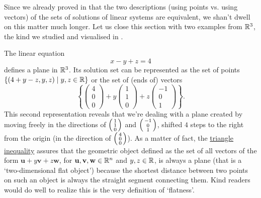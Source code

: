 Since we already proved in
 that the two
descriptions (using points vs. using vectors) of the sets of solutions of linear
systems are equivalent, we shan't dwell on this matter much longer. Let us close
this section with two examples from $\mathbb{R}^3$, the kind we studied and visualised
in .

The linear equation
\[
 x - y + z = 4
\]
defines a plane in $\mathbb{R}^3$. Its solution set can be represented as the set of
points $\{(4 + y - z, y, z) \mid y,z \in \mathbb{R}\}$ or the set of (ends of) vectors
\[
 \left\{ 
  \begin{pmatrix}
   4\\
   0\\
   0
  \end{pmatrix} + y
  \begin{pmatrix}
   1\\
   1\\
   0
  \end{pmatrix} + z
  \begin{pmatrix}
   -1\\
   0\\
   1
  \end{pmatrix}
 \right\}.
\]
This second representation reveals that we're dealing with a plane created by
moving freely in the directions of $\begin{psmallmatrix} 1\\1\\0
\end{psmallmatrix}$ and $\begin{psmallmatrix} -1\\0\\1 \end{psmallmatrix}$,
shifted $4$ steps to the right from the origin (in the direction of
$\begin{psmallmatrix} 4\\0\\0 \end{psmallmatrix}$). As a matter of fact, the
\hyperref[thm:triangle-inequality]{triangle inequality} assures that the
geometric object defined as the set of all vectors of the form $\mathbf{u} + y
\mathbf{v} + z \mathbf{w}$, for $\mathbf{u},\mathbf{v},\mathbf{w} \in \mathbb{R}^{n}$ and
$y,z \in \mathbb{R}$, is always a plane (that is a `two-dimensional flat object')
because the shortest distance between two points on such an object is always the
straight segment connecting them. Kind readers would do well to realize this is
the very definition of `flatness'.

